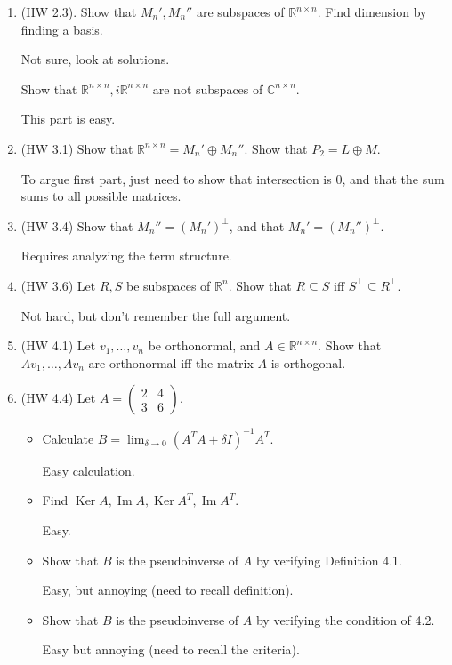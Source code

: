 \documentclass{article}
\newcommand{\mat}[1]{\begin{pmatrix}#1\end{pmatrix}}
\newcommand{\RR}{\mathbb{R}}
\newcommand{\CC}{\mathbb{C}}
\DeclareMathOperator{\Ker}{Ker}
\DeclareMathOperator{\Ima}{Im}
\DeclareMathOperator{\Ima}{Im}
\begin{document}
\begin{enumerate}
  \item  (HW 2.3). Show that $M_n', M_n''$ are subspaces of $\RR^{n \times n}$.  Find dimension by finding a basis.

    Not sure, look at solutions.

    Show that $\RR^{n \times n}, i \RR^{n \times n}$ are not subspaces of $\CC^{n \times n}$.

    This part is easy.

  \item (HW 3.1) Show that $\RR^{n \times n} = M_n' \oplus M_n''$.  Show that $P_2 = L \oplus M$.

    To argue first part, just need to show that intersection is $0$, and that the sum sums to all possible matrices.

  \item (HW 3.4) Show that $M_n'' = (M_n')^{\perp}$, and that $M_n' = (M_n'')^{\perp}$.

    Requires analyzing the term structure.

  \item (HW 3.6) Let $R, S$ be subspaces of $\RR^n$.  Show that $R \subseteq S$ iff $S^{\perp} \subseteq R^{\perp}$.

    Not hard, but don't remember the full argument.

  \item (HW 4.1) Let $v_1, \dots, v_n$ be orthonormal, and $A \in \RR^{n \times n}$.  Show that $Av_1, \dots, A v_n$ are orthonormal iff the matrix $A$ is orthogonal.

  \item (HW 4.4) Let $A = \mat{2 & 4 \\ 3 & 6}$.  

    \begin{itemize}
      \item Calculate $B = \lim_{\delta \to 0} (A^T A + \delta I)^{-1} A^T$.

        Easy calculation.

      \item Find $\Ker A, \Ima A, \Ker A^T, \Ima A^T$.

        Easy.

      \item Show that $B$ is the pseudoinverse of $A$ by verifying Definition 4.1.

        Easy, but annoying (need to recall definition).

      \item Show that $B$ is the pseudoinverse of $A$ by verifying the condition of 4.2.

        Easy but annoying (need to recall the criteria).
    \end{itemize} 
\end{enumerate}
\end{document}
